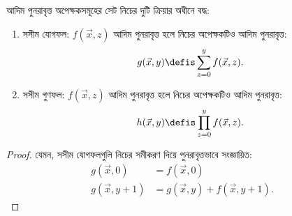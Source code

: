 \documentclass[../../../include/open-logic-section]{subfiles}
\begin{document}
\begin{prop}
আদিম পুনরাবৃত্ত অপেক্ষকসমূহের সেট নিচের দুটি ক্রিয়ার অধীনে বদ্ধ:
\begin{enumerate}
\item সসীম যোগফল: $f(\vec x, z)$ আদিম পুনরাবৃত্ত হলে নিচের অপেক্ষকটিও
আদিম পুনরাবৃত্ত:
\[
g(\vec x, y) \defis \sum_{z = 0}^y f(\vec x, z).
\]
\item সসীম গুণফল: $f(\vec x, z)$ আদিম পুনরাবৃত্ত হলে নিচের অপেক্ষকটিও
আদিম পুনরাবৃত্ত:
\[
h(\vec x, y) \defis \prod_{z = 0}^y f(\vec x, z).
\]
\end{enumerate}
\end{prop}

\begin{proof}
যেমন, সসীম যোগফলগুলি নিচের সমীকরণ দিয়ে পুনরাবৃত্তভাবে সংজ্ঞায়িত:
\begin{align*}
  g(\vec x, 0) & = f(\vec x, 0)\\
  g(\vec x, y+1) & = g(\vec x, y) + f(\vec x, y+1).
\end{align*}
\end{proof}
\end{document}

